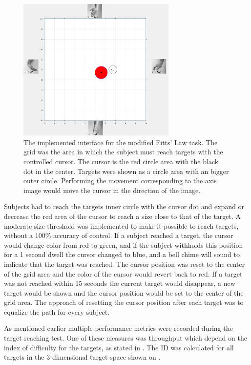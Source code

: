 \begin{figure}[H] 
	\includegraphics[width=0.7\textwidth]{figures/xBackground/perftestGUI}
	\caption{The implemented interface for the modified Fitts' Law task. The grid was the area in which the subject must reach targets with the controlled cursor. The cursor is the red circle area with the black dot in the center. Targets were shown as a circle area with an bigger outer circle. Performing the movement corresponding to the axis image would move the cursor in the direction of the image.}
	\label{fig:fittsLawTask}
\end{figure}

Subjects had to reach the targets inner circle with the cursor dot and expand or decrease the red area of the cursor to reach a size close to that of the target. A moderate size threshold was implemented to make it possible to reach targets, without a 100\% accuracy of control. If a subject reached a target, the cursor would change color from red to green, and if the subject withholds this position for a 1 second dwell the cursor changed to blue, and a bell chime will sound to indicate that the target was reached. The cursor position was reset to the center of the grid area and the color of the cursor would revert back to red. If a target was not reached within 15 seconds the current target would disappear, a new target would be shown and the cursor position would be set to the center of the grid area. The approach of resetting the cursor position after each target was to equalize the path for every subject. 

As mentioned earlier multiple performance metrics were recorded during the target reaching test. One of these measures was throughput which depend on the index of difficulty for the targets, as stated in . The ID was calculated for all targets in the 3-dimensional target space shown on . 

